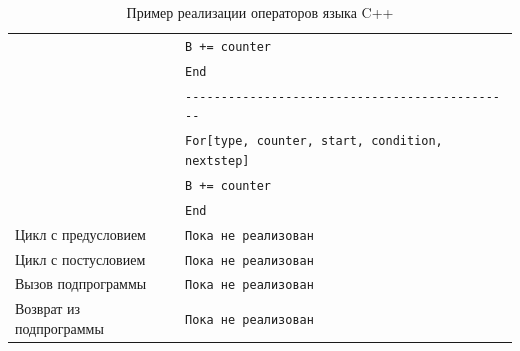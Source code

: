 \begin{table}
\begin{center}
\begin{tabular}{|l|l|}
                     & \verb"B += counter"\\
                     & \verb"End"\\
                     & \verb"----------------------------------------------" \\
                     & \verb"For[type, counter, start, condition, nextstep]"\\
                     & \verb"B += counter"\\
                     & \verb"End"\\
            \hline
            Цикл с предусловием & \verb"Пока не реализован" \\
            \hline
            Цикл с постусловием & \verb"Пока не реализован" \\
            \hline
            Вызов подпрограммы & \verb"Пока не реализован" \\
            \hline
            Возврат из подпрограммы & \verb"Пока не реализован"\\
            \hline
        \end{tabular}
    \end{center}
    \caption{Пример реализации операторов языка {\sf C++}}
    \label{tab:examstms}
\end{table}

